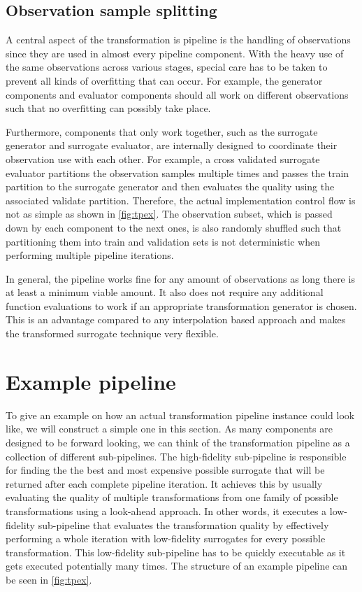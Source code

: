 \documentclass[
  a4paper,  %
  twoside,  %
  bibliography=totoc,
  headsepline,
  cleardoublepage=empty,
  parskip=half,
  draft=false
]{scrbook}
\begin{document}
\subsection{Observation sample splitting}

A central aspect of the transformation is pipeline is the handling of observations since they are used in almost every pipeline component.
With the heavy use of the same observations across various stages, special care has to be taken to prevent all kinds of overfitting that can occur.
For example, the generator components and evaluator components should all work on different observations such that no overfitting can possibly take place.

Furthermore, components that only work together, such as the surrogate generator and surrogate evaluator, are internally designed to coordinate their observation use with each other.
For example, a cross validated surrogate evaluator partitions the observation samples multiple times and passes the train partition to the surrogate generator and then evaluates the quality using the associated validate partition.
Therefore, the actual implementation control flow is not as simple as shown in \cref{fig:tpex}.
The observation subset, which is passed down by each component to the next ones, is also randomly shuffled such that partitioning them into train and validation sets is not deterministic when performing multiple pipeline iterations.

In general, the pipeline works fine for any amount of observations as long there is at least a minimum viable amount.
It also does not require any additional function evaluations to work if an appropriate transformation generator is chosen.
This is an advantage compared to any interpolation based approach and makes the transformed surrogate technique very flexible.

\newpage
\section{Example pipeline}

To give an example on how an actual transformation pipeline instance could look like, we will construct a simple one in this section.
As many components are designed to be forward looking, we can think of the transformation pipeline as a collection of different sub-pipelines.
The high-fidelity sub-pipeline is responsible for finding the the best and most expensive possible surrogate that will be returned after each complete pipeline iteration.
It achieves this by usually evaluating the quality of multiple transformations from one family of possible transformations using a look-ahead approach.
In other words, it executes a low-fidelity sub-pipeline that evaluates the transformation quality by effectively performing a whole iteration with low-fidelity surrogates for every possible transformation.
This low-fidelity sub-pipeline has to be quickly executable as it gets executed potentially many times.
The structure of an example pipeline can be seen in \cref{fig:tpex}.
\end{document}
